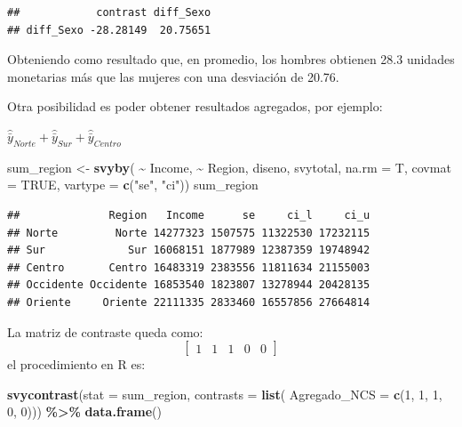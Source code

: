 \documentclass[
  spanish,
  12pt,
]{book}
\newenvironment{Shaded}{\begin{snugshade}}{\end{snugshade}}
\newcommand{\AttributeTok}[1]{\textcolor[rgb]{0.13,0.29,0.53}{#1}}
\newcommand{\ConstantTok}[1]{\textcolor[rgb]{0.56,0.35,0.01}{#1}}
\newcommand{\DecValTok}[1]{\textcolor[rgb]{0.00,0.00,0.81}{#1}}
\newcommand{\FunctionTok}[1]{\textcolor[rgb]{0.13,0.29,0.53}{\textbf{#1}}}
\newcommand{\NormalTok}[1]{#1}
\newcommand{\OtherTok}[1]{\textcolor[rgb]{0.56,0.35,0.01}{#1}}
\newcommand{\SpecialCharTok}[1]{\textcolor[rgb]{0.81,0.36,0.00}{\textbf{#1}}}
\newcommand{\StringTok}[1]{\textcolor[rgb]{0.31,0.60,0.02}{#1}}
\begin{document}
\begin{verbatim}
##            contrast diff_Sexo
## diff_Sexo -28.28149  20.75651
\end{verbatim}

Obteniendo como resultado que, en promedio, los hombres obtienen 28.3 unidades monetarias más que las mujeres con una desviación de 20.76.

Otra posibilidad es poder obtener resultados agregados, por ejemplo:

\(\hat{\bar{y}}_{Norte}+\hat{\bar{y}}_{Sur} +\hat{\bar{y}}_{Centro}\)

\begin{Shaded}
\begin{Highlighting}[]
\NormalTok{sum\_region }\OtherTok{\textless{}{-}} \FunctionTok{svyby}\NormalTok{( }\SpecialCharTok{\textasciitilde{}}\NormalTok{ Income,  }\SpecialCharTok{\textasciitilde{}}\NormalTok{ Region,}
\NormalTok{                     diseno, svytotal, }\AttributeTok{na.rm =}\NormalTok{ T,}
                     \AttributeTok{covmat =} \ConstantTok{TRUE}\NormalTok{,}
                     \AttributeTok{vartype =} \FunctionTok{c}\NormalTok{(}\StringTok{"se"}\NormalTok{, }\StringTok{"ci"}\NormalTok{))}
\NormalTok{sum\_region}
\end{Highlighting}
\end{Shaded}

\begin{verbatim}
##              Region   Income      se     ci_l     ci_u
## Norte         Norte 14277323 1507575 11322530 17232115
## Sur             Sur 16068151 1877989 12387359 19748942
## Centro       Centro 16483319 2383556 11811634 21155003
## Occidente Occidente 16853540 1823807 13278944 20428135
## Oriente     Oriente 22111335 2833460 16557856 27664814
\end{verbatim}

La matriz de contraste queda como:
\[
\left[\begin{array}{cccccc}
1 & 1 & 1 & 0 & 0
\end{array}\right]
\]
el procedimiento en R es:

\begin{Shaded}
\begin{Highlighting}[]
\FunctionTok{svycontrast}\NormalTok{(}\AttributeTok{stat =}\NormalTok{ sum\_region,}
            \AttributeTok{contrasts =} \FunctionTok{list}\NormalTok{(}
                             \AttributeTok{Agregado\_NCS =} \FunctionTok{c}\NormalTok{(}\DecValTok{1}\NormalTok{, }\DecValTok{1}\NormalTok{, }\DecValTok{1}\NormalTok{, }\DecValTok{0}\NormalTok{, }\DecValTok{0}\NormalTok{))) }\SpecialCharTok{\%\textgreater{}\%}                        \FunctionTok{data.frame}\NormalTok{()}
\end{Highlighting}
\end{Shaded}
\end{document}
